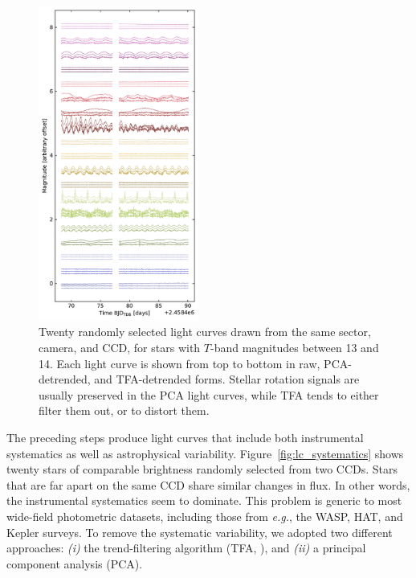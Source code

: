 \documentclass[12pt,twocolumn,tighten]{aastex62}
\begin{document}
\begin{figure}[!t]
	\begin{center}
		\leavevmode
		\includegraphics[width=0.47\textwidth]{detrended_light_curves_sec6cam1ccd1.pdf}
	\end{center}
	\vspace{-0.5cm}
	\caption{
    Twenty randomly selected light curves drawn
    from the same sector, camera,
    and CCD, for stars with $T$-band magnitudes between 13 and 14.
    Each light curve is shown from top to bottom in raw, PCA-detrended, and
    TFA-detrended forms.
    Stellar rotation signals are usually preserved in the PCA light curves,
    while TFA tends to either filter them out, or to distort them.
		\label{fig:detrended}
	}
\end{figure}


The preceding steps produce light curves that include both
instrumental systematics as well as astrophysical variability.
Figure~\ref{fig:lc_systematics} shows twenty stars of
comparable brightness randomly selected from two CCDs.  Stars that are
far apart on the same CCD share similar changes in flux.
In other words, the instrumental systematics seem to dominate.
This problem is generic to most wide-field photometric datasets, including
those from {\it e.g.}, the WASP, HAT, and Kepler surveys.
To remove the systematic variability, we adopted two different
approaches: {\it (i)} the trend-filtering algorithm (TFA,
\citealt{kovacs_trend_2005}), and {\it (ii)} a principal component analysis
(PCA).
\end{document}
